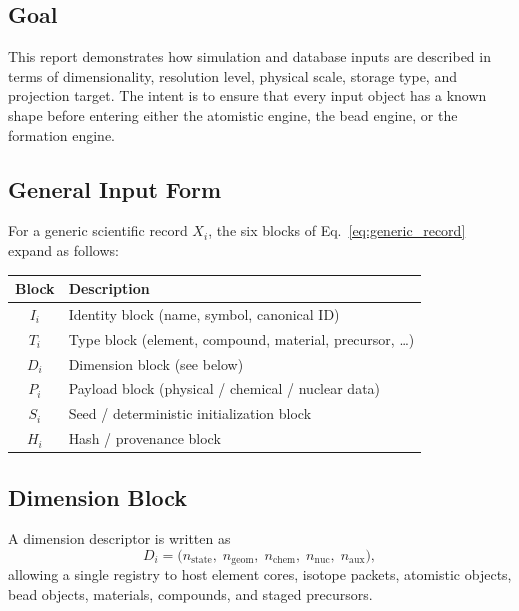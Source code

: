 \documentclass[11pt, a4paper, oneside]{article}
\begin{document}
\subsection{Goal}

This report demonstrates how simulation and database inputs are described in
terms of dimensionality, resolution level, physical scale, storage type, and
projection target.  The intent is to ensure that every input object has a known
shape before entering either the atomistic engine, the bead engine, or the
formation engine.

\subsection{General Input Form}

For a generic scientific record $X_i$, the six blocks of
Eq.~\eqref{eq:generic_record} expand as follows:

\begin{center}
\begin{tabular}{@{} cl @{}}
\toprule
\textbf{Block} & \textbf{Description}\\
\midrule
$I_i$ & Identity block (name, symbol, canonical ID)\\
$T_i$ & Type block (element, compound, material, precursor, \ldots)\\
$D_i$ & Dimension block (see below)\\
$P_i$ & Payload block (physical / chemical / nuclear data)\\
$S_i$ & Seed / deterministic initialization block\\
$H_i$ & Hash / provenance block\\
\bottomrule
\end{tabular}
\end{center}

\subsection{Dimension Block}
\label{sec:dim_block}

A dimension descriptor is written as
\begin{equation}
\label{eq:dim_block}
D_i = \bigl(n_{\text{state}},\; n_{\text{geom}},\; n_{\text{chem}},\;
             n_{\text{nuc}},\; n_{\text{aux}}\bigr),
\end{equation}
allowing a single registry to host element cores, isotope packets, atomistic
objects, bead objects, materials, compounds, and staged precursors.
\end{document}
